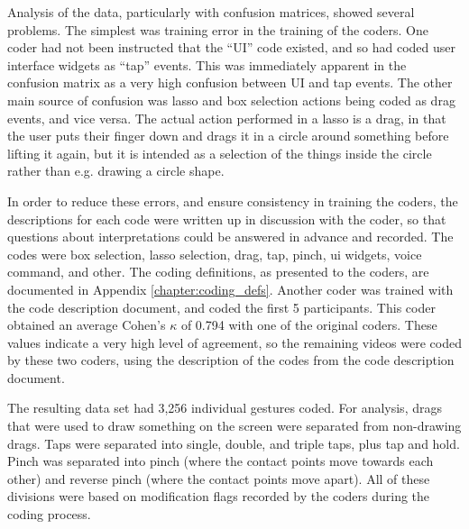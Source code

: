 Analysis of the data, particularly with confusion matrices, showed several problems. 
The simplest was training error in the training of the coders.
One coder had not been instructed that the ``UI'' code existed, and so had coded user interface widgets as ``tap'' events.   
This was immediately apparent in the confusion matrix as a very high confusion between UI and tap events. 
The other main source of confusion was lasso and box selection actions being coded as drag events, and vice versa.
The actual action performed in a lasso is a drag, in that the user puts their finger down and drags it in a circle around something before lifting it again, but it is intended as a selection of the things inside the circle rather than e.g. drawing a circle shape. 

In order to reduce these errors, and ensure consistency in training the coders, the descriptions for each code were written up in discussion with the coder, so that questions about interpretations could be answered in advance and recorded. 
The codes were box selection, lasso selection, drag, tap, pinch, ui widgets, voice command, and other. 
The coding definitions, as presented to the coders, are documented in Appendix \ref{chapter:coding_defs}.
Another coder was trained with the code description document, and coded the first 5 participants. 
This coder obtained an average Cohen's $\kappa$ of 0.794 with one of the original coders.
These values indicate a very high level of agreement, so the remaining videos were coded by these two coders, using the description of the codes from the code description document.  

The resulting data set had 3,256 individual gestures coded. 
For analysis, drags that were used to draw something on the screen were separated from non-drawing drags. 
Taps were separated into single, double, and triple taps, plus tap and hold. 
Pinch was separated into pinch (where the contact points move towards each other) and reverse pinch (where the contact points move apart).
All of these divisions were based on modification flags recorded by the coders during the coding process.  

